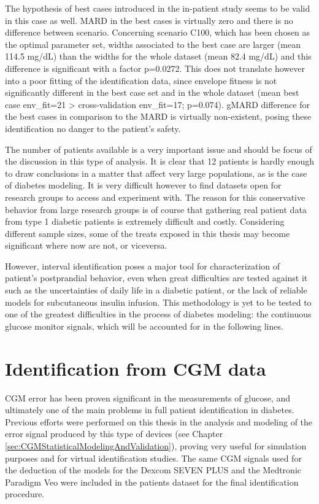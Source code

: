 The hypothesis of best cases introduced in the in-patient study seems to be valid in this case as well. MARD in the best cases is virtually zero and there is no difference between scenario. Concerning scenario C100, which has been chosen as the optimal parameter set, widths associated to the best case are larger (mean 114.5 mg/dL) than the widths for the whole dataset (mean 82.4 mg/dL) and this difference is significant with a factor p=0.0272. This does not translate however into a poor fitting of the identification data, since envelope fitness is not significantly different in the best case set and in the whole dataset (mean best case env\_fit=21 > cross-validation env\_fit=17; p=0.074). gMARD difference for the best cases in comparison to the MARD is virtually non-existent, posing these identification no danger to the patient's safety.

The number of patients available is a very important issue and should be focus of the discussion in this type of analysis. It is clear that 12 patients is hardly enough to draw conclusions in a matter that affect very large populations, as is the case of diabetes modeling. It is very difficult however to find datasets open for research groups to access and experiment with. The reason for this conservative behavior from large research groups is of course that gathering real patient data from type 1 diabetic patients is extremely difficult and costly. Considering different sample sizes, some of the treats exposed in this thesis may become significant where now are not, or viceversa.

However, interval identification poses a major tool for characterization of patient's postprandial behavior, even when great difficulties are tested against it such as the uncertainties of daily life in a diabetic patient, or the lack of reliable models for subcutaneous insulin infusion. This methodology is yet to be tested to one of the greatest difficulties in the process of diabetes modeling: the continuous glucose monitor signals, which will be accounted for in the following lines.

\section{Identification from CGM data}
\label{sec:CGMIdentification}

CGM error has been proven significant in the measurements of glucose, and ultimately one of the main problems in full patient identification in diabetes. Previous efforts were performed on this thesis in the analysis and modeling of the error signal produced by this type of devices (see Chapter \ref{sec:CGMStatisticalModelingAndValidation}), proving very useful for simulation purposes and for virtual identification studies. The same CGM signals used for the deduction of the models for the Dexcom\textsuperscript{\textregistered} SEVEN\textsuperscript{\textregistered} PLUS and the Medtronic\textsuperscript{\textregistered} Paradigm\textsuperscript{\textregistered} Veo\texttrademark{} were included in the patients dataset for the final identification procedure.

